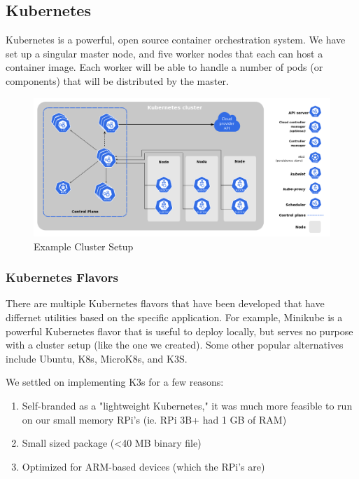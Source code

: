 \subsection{Kubernetes}

Kubernetes \cite{www-kubernetes} is a powerful, open source container orchestration system. We have set up a singular master node, and five worker nodes that each can host a container image. Each worker will be able to handle a number of pods (or components) that will be distributed by the master.

\begin{figure}[htb]
  \includegraphics[width=\linewidth]{images/cluster_image.png}
  \caption{Example Cluster Setup \cite{kubernetes-image}}
\end{figure}

\subsubsection{Kubernetes Flavors}
There are multiple Kubernetes flavors that have been developed that have differnet utilities based on the specific application. For example, Minikube is a powerful Kubernetes flavor that is useful to deploy locally, but serves no purpose with a cluster setup (like the one we created). Some other popular alternatives include Ubuntu, K8s, MicroK8s, and K3S. 

We settled on implementing K3s for a few reasons:

\begin{enumerate}
    \item Self-branded as a "lightweight Kubernetes," it was much more feasible to run on our small memory RPi's (ie. RPi 3B+ had 1 GB of RAM)
    \item Small sized package (<40 MB binary file)
    \item Optimized for ARM-based devices (which the RPi's are)
\end{enumerate}


